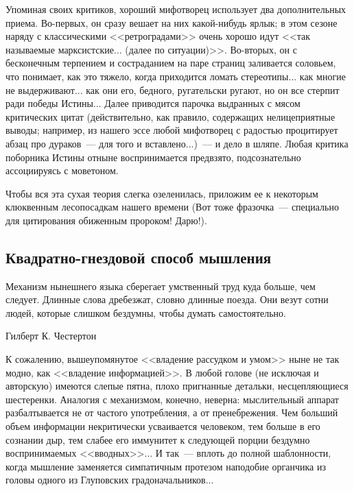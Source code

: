 \documentclass{scrbook}
\makeatletter
\newcommand{\defaultepigraphwidth}{0.5} %
\newcommand{\flqq}{<<}
\newcommand{\frqq}{>>}
\newcommand{\mdash}{~--- }
\newcommand{\essaysection}[1]{\subsection*{#1}\nopagebreak}
\newcommand{\myepigraph}[3][\@empty]{
	\ifx\@empty#1
		\setlength{\epigraphwidth}{\defaultepigraphwidth\textwidth}
	\else
		\setlength{\epigraphwidth}{#1\textwidth}
	\fi
	\epigraph{#2}{#3}
	\setlength{\epigraphwidth}{\defaultepigraphwidth\textwidth} %
	\nopagebreak
}
\makeatother
\begin{document}
Упоминая своих критиков, хороший мифотворец использует два дополнительных приема. Во-первых, он сразу вешает на них какой-нибудь ярлык; в этом сезоне наряду с классическими {\flqq}ретроградами{\frqq} очень хорошо идут {\flqq}так называемые марксистские... (далее по ситуации){\frqq}. Во-вторых, он с бесконечным терпением и состраданием на паре страниц заливается соловьем, что понимает, как это тяжело, когда приходится ломать стереотипы... как многие не выдерживают... как они его, бедного, ругательски ругают, но он все стерпит ради победы Истины... Далее приводится парочка выдранных с мясом критических цитат (действительно, как правило, содержащих нелицеприятные выводы; например, из нашего эссе любой мифотворец с радостью процитирует абзац про дураков{\mdash}для того и вставлено...){\mdash}и дело в шляпе. Любая критика поборника Истины отныне воспринимается предвзято, подсознательно ассоциируясь с моветоном.

Чтобы вся эта сухая теория слегка озеленилась, приложим ее к некоторым клюквенным лесопосадкам нашего времени (Вот тоже фразочка{\mdash}специально для цитирования обиженным пророком! Дарю!).

\essaysection{Квадратно-гнездовой способ мышления}

\myepigraph{Механизм нынешнего языка сберегает умственный труд куда больше, чем следует. Длинные слова дребезжат, словно длинные поезда. Они везут сотни людей, которые слишком бездумны, чтобы думать самостоятельно.}
{Гилберт К. Честертон}

К сожалению, вышеупомянутое {\flqq}владение рассудком и умом{\frqq} ныне не так модно, как {\flqq}владение информацией{\frqq}. В любой голове (не исключая и авторскую) имеются слепые пятна, плохо пригнанные детальки, несцепляющиеся шестеренки. Аналогия с механизмом, конечно, неверна: мыслительный аппарат разбалтывается не от частого употребления, а от пренебрежения. Чем больший объем информации некритически усваивается человеком, тем больше в его сознании дыр, тем слабее его иммунитет к следующей порции бездумно воспринимаемых {\flqq}вводных{\frqq}... И так{\mdash}вплоть до полной шаблонности, когда мышление заменяется симпатичным протезом наподобие органчика из головы одного из Глуповских градоначальников...
\end{document}
